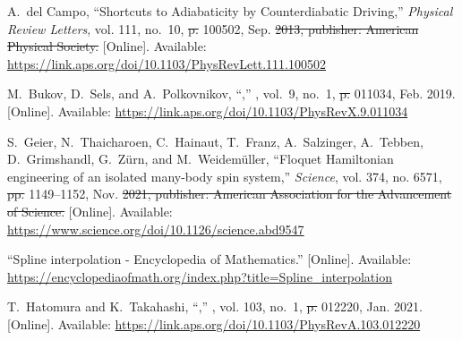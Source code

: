 \documentclass[a4paper,oneside,11pt]{book}
\providecommand{\DIFaddtex}[1]{{\protect\color{blue}\uwave{#1}}} %
\providecommand{\DIFdeltex}[1]{{\protect\color{red}\sout{#1}}}                      %
\providecommand{\DIFaddbegin}{} %
\providecommand{\DIFaddend}{} %
\providecommand{\DIFdelbegin}{} %
\providecommand{\DIFdelend}{} %
\providecommand{\DIFadd}[1]{\texorpdfstring{\DIFaddtex{#1}}{#1}} %
\providecommand{\DIFdel}[1]{\texorpdfstring{\DIFdeltex{#1}}{}} %
\newcommand{\DIFscaledelfig}{0.5}
\newlength{\DIFdelgraphicswidth} %
\newlength{\DIFdelgraphicsheight} %
\newcommand{\DIFaddincludegraphics}[2][]{{\color{blue}\fbox{\DIFOincludegraphics[#1]{#2}}}} %
\newcommand{\DIFdelincludegraphics}[2][]{%
\sbox{\DIFdelgraphicsbox}{\DIFOincludegraphics[#1]{#2}}%
\settoboxwidth{\DIFdelgraphicswidth}{\DIFdelgraphicsbox} %
\settoboxtotalheight{\DIFdelgraphicsheight}{\DIFdelgraphicsbox} %
\scalebox{\DIFscaledelfig}{%
\parbox[b]{\DIFdelgraphicswidth}{\usebox{\DIFdelgraphicsbox}\\[-\baselineskip] \rule{\DIFdelgraphicswidth}{0em}}\llap{\resizebox{\DIFdelgraphicswidth}{\DIFdelgraphicsheight}{%
\setlength{\unitlength}{\DIFdelgraphicswidth}%
\begin{picture}(1,1)%
\thicklines\linethickness{2pt} %
{\color[rgb]{1,0,0}\put(0,0){\framebox(1,1){}}}%
{\color[rgb]{1,0,0}\put(0,0){\line( 1,1){1}}}%
{\color[rgb]{1,0,0}\put(0,1){\line(1,-1){1}}}%
\end{picture}%
}\hspace*{3pt}}} %
} %
\DeclareRobustCommand{\DIFaddbegin}{\DIFOaddbegin \let\includegraphics\DIFaddincludegraphics} %
\DeclareRobustCommand{\DIFaddend}{\DIFOaddend \let\includegraphics\DIFOincludegraphics} %
\DeclareRobustCommand{\DIFdelbegin}{\DIFOdelbegin \let\includegraphics\DIFdelincludegraphics} %
\DeclareRobustCommand{\DIFdelend}{\DIFOaddend \let\includegraphics\DIFOincludegraphics} %
\begin{document}
\begin{thebibliography}{100}
\BIBentryALTinterwordspacing
A.~del Campo, ``Shortcuts to {Adiabaticity} by {Counterdiabatic} {Driving},''
  \emph{Physical Review Letters}, vol. 111, no.~10,  \DIFdelbegin \DIFdel{p. }\DIFdelend 100502, Sep. \DIFdelbegin \DIFdel{2013,
  publisher: American Physical Society. }\DIFdelend \DIFaddbegin \DIFadd{2013.
  }\DIFaddend [Online]. Available:
  \url{https://link.aps.org/doi/10.1103/PhysRevLett.111.100502}
\BIBentrySTDinterwordspacing

\BIBentryALTinterwordspacing
M.~Bukov, D.~Sels, and A.~Polkovnikov, ``,''
  \emph{}, vol.~9, no.~1,  \DIFdelbegin \DIFdel{p. }\DIFdelend 011034,
  Feb. 2019. [Online]. Available:
  \url{https://link.aps.org/doi/10.1103/PhysRevX.9.011034}
\BIBentrySTDinterwordspacing

\BIBentryALTinterwordspacing
S.~Geier, N.~Thaicharoen, C.~Hainaut, T.~Franz, A.~Salzinger, A.~Tebben,
  D.~Grimshandl, G.~Zürn, and M.~Weidemüller, ``Floquet {Hamiltonian}
  engineering of an isolated many-body spin system,'' \emph{Science}, vol. 374,
  no. 6571,  \DIFdelbegin \DIFdel{pp. }\DIFdelend 1149--1152, Nov. \DIFdelbegin \DIFdel{2021, publisher: American Association for the
  Advancement of Science. }\DIFdelend \DIFaddbegin \DIFadd{2021. }\DIFaddend [Online]. Available:
  \url{https://www.science.org/doi/10.1126/science.abd9547}
\BIBentrySTDinterwordspacing

\BIBentryALTinterwordspacing
``Spline interpolation - {Encyclopedia} of {Mathematics}.'' [Online].
  Available:
  \url{https://encyclopediaofmath.org/index.php?title=Spline_interpolation}
\BIBentrySTDinterwordspacing

\BIBentryALTinterwordspacing
T.~Hatomura and K.~Takahashi, ``,'' \emph{}, vol. 103,
  no.~1,  \DIFdelbegin \DIFdel{p. }\DIFdelend 012220, Jan. 2021. [Online]. Available:
  \url{https://link.aps.org/doi/10.1103/PhysRevA.103.012220}
\BIBentrySTDinterwordspacing


\end{thebibliography}
\end{document}
